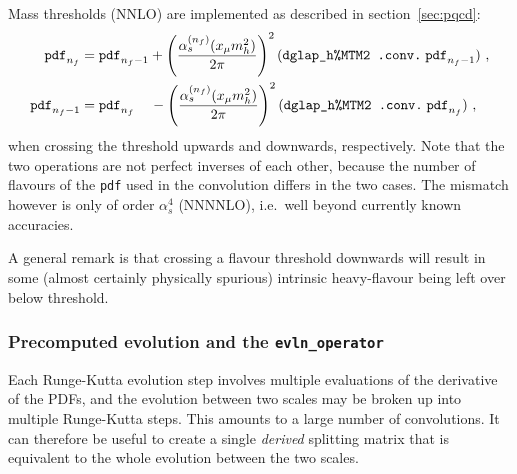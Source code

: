 \documentclass[12pt]{article}
\newcommand{\as}{\alpha_s}
\newcommand{\ie}{i.e.\ }
\newcommand{\ttt}[1]{\texttt{#1}}
\begin{document}
Mass thresholds (NNLO) are implemented as described in
section~\ref{sec:pqcd}:
\begin{subequations}
\label{eq:mass_threshold}
\begin{align}
  \ttt{pdf}_{n_f} &= \ttt{pdf}_{n_f-1} +
  \left(\frac{\alpha_{s}^{(n_f)}(x_\mu m_h^2)}{2\pi}\right)^2
  (\mbox{\ttt{dglap\_h\%MTM2 .conv.}}\; \ttt{pdf}_{n_f-1}) \ ,\\
  \ttt{pdf}_{n_f-1} &= \ttt{pdf}_{n_f} \;\;\;\;-
  \left(\frac{\alpha_{s}^{(n_f)}(x_\mu m_h^2)}{2\pi}\right)^2
  (\mbox{\ttt{dglap\_h\%MTM2 .conv.}}\; \ttt{pdf}_{n_f}) \ ,
\end{align}
\end{subequations}
when crossing the threshold upwards and downwards, respectively. Note
that the two operations are not perfect inverses of each other,
because the number of flavours of the \ttt{pdf} used in the
convolution differs in the two cases. The mismatch however is only of
order $\as^4$ (NNNNLO), \ie well beyond currently known accuracies.

A general remark is that crossing a flavour threshold downwards will
result in some (almost certainly physically spurious)
intrinsic heavy-flavour being left over below threshold.

\subsubsection{Precomputed evolution and the \ttt{evln\_operator}}
\label{sec:precomputed-evolution}

Each Runge-Kutta evolution step involves multiple evaluations of the
derivative of the PDFs, and the evolution between two scales may be
broken up into multiple Runge-Kutta steps. This amounts to a large
number of convolutions. It can therefore be useful to create a single
\emph{derived} splitting matrix that is equivalent to the whole
evolution between the two scales. 
\end{document}
